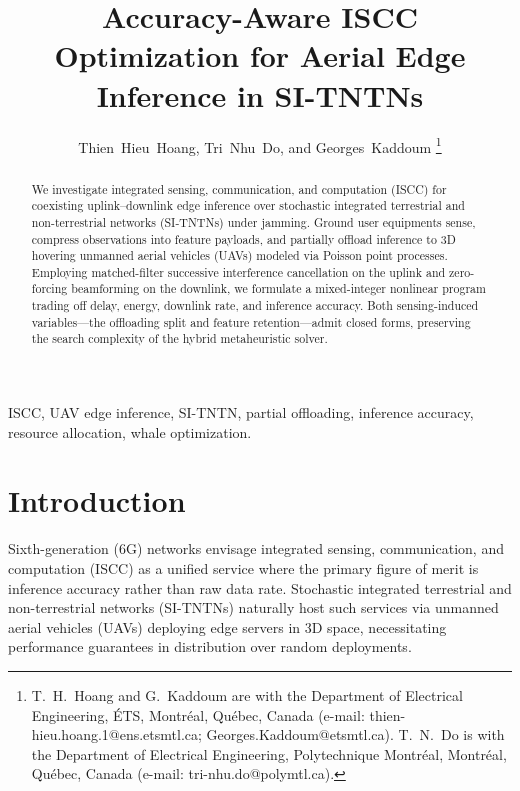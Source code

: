 \documentclass[journal]{IEEEtran}
\begin{document}
\title{Accuracy-Aware ISCC Optimization for Aerial Edge Inference in SI-TNTNs}

\author{Thien~Hieu~Hoang, Tri~Nhu~Do, and Georges~Kaddoum%
\thanks{T.~H.~Hoang and G.~Kaddoum are with the Department of Electrical Engineering, \'{E}TS, Montr\'{e}al, Qu\'{e}bec, Canada (e-mail: \mbox{thien-hieu.hoang.1@ens.etsmtl.ca}; \mbox{Georges.Kaddoum@etsmtl.ca}). T.~N.~Do is with the Department of Electrical Engineering, Polytechnique Montr\'{e}al, Montr\'{e}al, Qu\'{e}bec, Canada (e-mail: \mbox{tri-nhu.do@polymtl.ca}).}}
\maketitle

\begin{abstract}
\color{blue}We investigate integrated sensing, communication, and computation (ISCC) for coexisting uplink--downlink edge inference over stochastic integrated terrestrial and non-terrestrial networks (SI-TNTNs) under jamming. Ground user equipments sense, compress observations into feature payloads, and partially offload inference to 3D hovering unmanned aerial vehicles (UAVs) modeled via Poisson point processes. Employing matched-filter successive interference cancellation on the uplink and zero-forcing beamforming on the downlink, we formulate a mixed-integer nonlinear program trading off delay, energy, downlink rate, and inference accuracy. Both sensing-induced variables---the offloading split and feature retention---admit closed forms, preserving the search complexity of the hybrid metaheuristic solver.
\end{abstract}

\begin{IEEEkeywords}
ISCC, UAV edge inference, SI-TNTN, partial offloading, inference accuracy, resource allocation, whale optimization.
\end{IEEEkeywords}

\section{Introduction}
{\color{blue}Sixth-generation (6G) networks envisage integrated sensing, communication, and computation (ISCC) as a unified service where the primary figure of merit is inference accuracy rather than raw data rate. Stochastic integrated terrestrial and non-terrestrial networks (SI-TNTNs) \cite{meftah2026sitntn} naturally host such services via unmanned aerial vehicles (UAVs) deploying edge servers in 3D space, necessitating performance guarantees in distribution over random deployments.}
\end{document}

